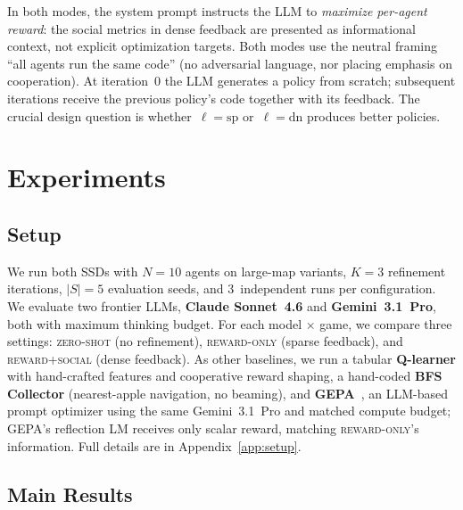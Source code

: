 \documentclass{nextgame2026} %
\begin{document}
In both modes, the system prompt instructs the LLM to
\emph{maximize per-agent reward}: the social metrics in dense feedback
are presented as informational context, not explicit optimization
targets.  Both modes use the neutral framing ``all agents run the same
code'' (no adversarial language, nor placing emphasis on cooperation).
At iteration~0 the LLM generates a policy from scratch; subsequent
iterations receive the previous policy's code together with its feedback.
The crucial design question is whether~$\ell = \mathrm{sp}$
or~$\ell = \mathrm{dn}$ produces better policies.


\section{Experiments}
\label{sec:experiments}

\subsection{Setup}

We run both SSDs with $N\!=\!10$ agents on large-map variants,
$K\!=\!3$ refinement iterations, $|S|\!=\!5$ evaluation seeds, and
3~independent runs per configuration.
We evaluate two frontier LLMs, \textbf{Claude Sonnet~4.6} and
\textbf{Gemini~3.1~Pro}, both with maximum thinking budget.
For each model$\,\times\,$game, we compare three settings:
\textsc{zero-shot} (no refinement), \textsc{reward-only} (sparse
feedback), and \textsc{reward+social} (dense feedback).
As other baselines, we run a tabular \textbf{Q-learner} with
hand-crafted features and cooperative reward shaping, a hand-coded
\textbf{BFS Collector} (nearest-apple navigation, no beaming), and
\textbf{GEPA}~\citep{gepa}, an LLM-based prompt optimizer using the same
Gemini~3.1~Pro and matched compute budget; GEPA's reflection LM receives
only scalar reward, matching \textsc{reward-only}'s information.
Full details are in Appendix~\ref{app:setup}.

\subsection{Main Results}
\end{document}
